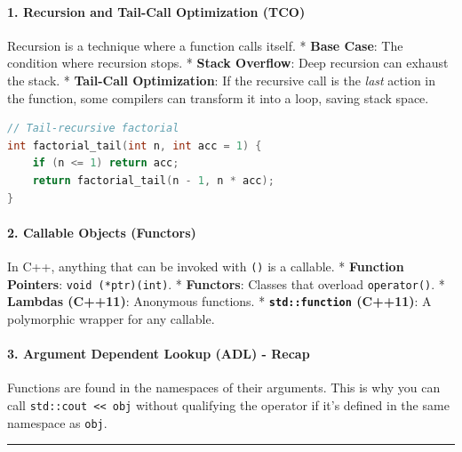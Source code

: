 \hypertarget{recursion-and-tail-call-optimization-tco}{%
\paragraph{1. Recursion and Tail-Call Optimization
(TCO)}\label{recursion-and-tail-call-optimization-tco}}

Recursion is a technique where a function calls itself. * \textbf{Base
Case}: The condition where recursion stops. * \textbf{Stack Overflow}:
Deep recursion can exhaust the stack. * \textbf{Tail-Call Optimization}:
If the recursive call is the \emph{last} action in the function, some
compilers can transform it into a loop, saving stack space.

\begin{lstlisting}[language={C++}]
// Tail-recursive factorial
int factorial_tail(int n, int acc = 1) {
    if (n <= 1) return acc;
    return factorial_tail(n - 1, n * acc);
}
\end{lstlisting}

\hypertarget{callable-objects-functors}{%
\paragraph{2. Callable Objects
(Functors)}\label{callable-objects-functors}}

In C++, anything that can be invoked with \passthrough{\lstinline!()!}
is a callable. * \textbf{Function Pointers}:
\passthrough{\lstinline!void (*ptr)(int)!}. * \textbf{Functors}: Classes
that overload \passthrough{\lstinline!operator()!}. * \textbf{Lambdas
(C++11)}: Anonymous functions. *
\textbf{\passthrough{\lstinline!std::function!} (C++11)}: A polymorphic
wrapper for any callable.

\hypertarget{argument-dependent-lookup-adl---recap}{%
\paragraph{3. Argument Dependent Lookup (ADL) -
Recap}\label{argument-dependent-lookup-adl---recap}}

Functions are found in the namespaces of their arguments. This is why
you can call \passthrough{\lstinline!std::cout << obj!} without
qualifying the operator if it's defined in the same namespace as
\passthrough{\lstinline!obj!}.

\begin{center}\rule{0.5\linewidth}{0.5pt}\end{center}

